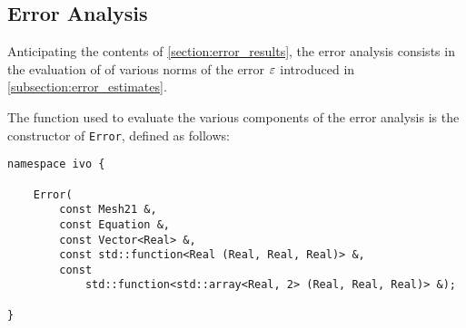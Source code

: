 \newpage
\subsection{Error Analysis}

Anticipating the contents of \cref{section:error_results}, the error analysis consists in the evaluation of of various norms of the error $\varepsilon$ introduced in \cref{subsection:error_estimates}.

The function used to evaluate the various components of the error analysis is the constructor of \lstinline{Error}, defined as follows:
\begin{lstlisting}[style=cpp]
namespace ivo {

    Error(
        const Mesh21 &, 
        const Equation &, 
        const Vector<Real> &, 
        const std::function<Real (Real, Real, Real)> &, 
        const 
            std::function<std::array<Real, 2> (Real, Real, Real)> &);

}
\end{lstlisting}